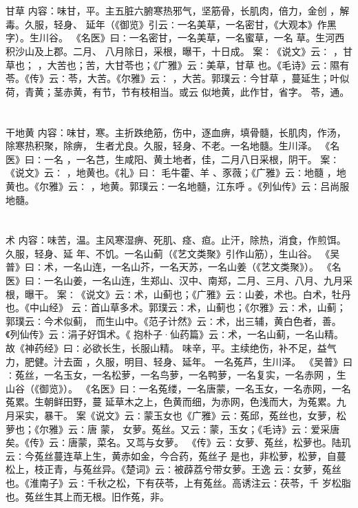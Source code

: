 \documentclass[12pt,UTF8]{ctexbook}
\begin{document}
\chapter{}甘草
内容：味甘，平。主五脏六腑寒热邪气，坚筋骨，长肌肉，倍力，金创 ，解毒。久服，轻身、 
延年（《御览》引云∶一名美草，一名密甘，《大观本》作黑字）。生川谷。 
《名医》曰∶一名密甘，一名美草，一名蜜草，一名 草。生河西积沙山及上郡。二月、 
八月除日，采根，曝干，十日成。 
案∶《说文》云∶ ，甘草也； ，大苦也；苦，大甘苓也；《广雅》云∶美草，甘草 
也。《毛诗》云∶隰有苓。《传》云∶苓，大苦。《尔雅》云∶ ，大苦。郭璞云∶今甘草 
，蔓延生；叶似荷，青黄；茎赤黄，有节，节有枝相当。或云 似地黄，此作甘，省字。 
苓，通。 


\chapter{}干地黄
内容：味甘，寒。主折跌绝筋，伤中，逐血痹，填骨髓，长肌肉，作汤，除寒热积聚，除痹， 
生者尤良。久服，轻身、不老。一名地髓。生川泽。 
《名医》曰∶一名 ，一名芑，生咸阳、黄土地者，佳，二月八日采根，阴干。 
案∶《说文》云∶ ，地黄也。《礼》曰∶ 毛牛藿、羊 、豕薇；《广雅》云∶地髓 
，地黄也。《尔雅》云∶ ，地黄。郭璞云∶一名地髓，江东呼 。《列仙传》云∶吕尚服 
地髓。 


\chapter{}术
内容：味苦，温。主风寒湿痹、死肌、痉、疸。止汗，除热，消食，作煎饵。久服，轻身、延 
年、不饥。一名山蓟（《艺文类聚》引作山筋），生山谷。 
《吴普》曰∶术，一名山连，一名山芥，一名天苏，一名山姜（《艺文类聚》）。 
《名医》曰∶一名山姜，一名山连，生郑山、汉中、南郑，二月、三月、八月、九月采 
根，曝干。 
案∶《说文》云∶术，山蓟也；《广雅》云∶山姜，术也。白术，牡丹也。《中山经》 
云∶首山草多术。郭璞云∶术，山蓟也；《尔雅》云∶术，山蓟；郭璞云∶今术似蓟， 
而生山中。《范子计然》云∶术，出三辅，黄白色者，善。《列仙传》云∶涓子好饵术。《 
抱朴子·仙药篇》云∶术，一名山蓟，一名山精。故《神药经》曰∶必欲长生，长服山精。 
味辛，平。主续绝伤，补不足，益气力，肥健。汁去面 ，久服，明目、轻身、延年。 
一名菟芦，生川泽。 
《吴普》曰∶菟丝，一名玉女，一名松萝，一名鸟萝，一名鸭萝，一名复实，一名赤网 
，生山谷（《御览》）。 
《名医》曰∶一名菟缕，一名唐蒙，一名玉女，一名赤网，一名菟累。生朝鲜田野，蔓 
延草木之上，色黄而细，为赤网，色浅而大，为菟累。九月采实，暴干。 
案《说文》云∶蒙玉女也《广雅》云∶菟邱，菟丝也，女萝，松萝也；《尔雅》云∶唐 
蒙， 
女萝。菟丝。又云∶蒙，玉女；《毛诗》云∶爱采唐矣。《传》云∶唐蒙，菜名。又茑与女萝。 
《传》云∶女萝、菟丝，松萝也。陆玑云∶今菟丝蔓连草上生，黄赤如金，今合药，菟丝子 
是也，非松萝，松萝，自蔓松上，枝正青，与菟丝异。《楚词》云∶被薜荔兮带女萝。王逸 
云∶女萝，菟丝也。《淮南子》云∶千秋之松，下有茯苓，上有菟丝。高诱注云∶茯苓，千 
岁松脂也。菟丝生其上而无根。旧作菟，非。 
\end{document}
